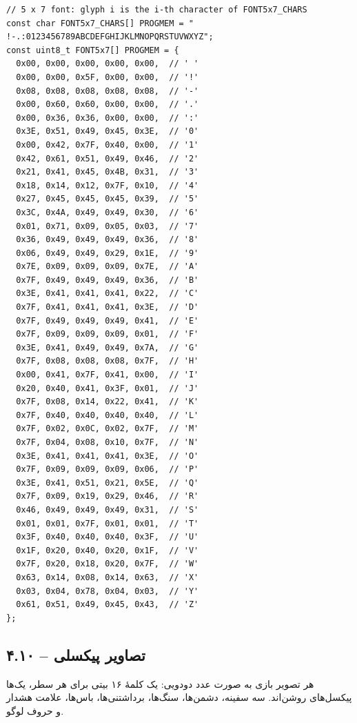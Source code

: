 \documentclass[11pt,a4paper]{article}
\begin{document}
\begin{latin}
\begin{lstlisting}[language=Arduino]
// 5 x 7 font: glyph i is the i-th character of FONT5x7_CHARS
const char FONT5x7_CHARS[] PROGMEM = " !-.:0123456789ABCDEFGHIJKLMNOPQRSTUVWXYZ";
const uint8_t FONT5x7[] PROGMEM = {
  0x00, 0x00, 0x00, 0x00, 0x00,  // ' '
  0x00, 0x00, 0x5F, 0x00, 0x00,  // '!'
  0x08, 0x08, 0x08, 0x08, 0x08,  // '-'
  0x00, 0x60, 0x60, 0x00, 0x00,  // '.'
  0x00, 0x36, 0x36, 0x00, 0x00,  // ':'
  0x3E, 0x51, 0x49, 0x45, 0x3E,  // '0'
  0x00, 0x42, 0x7F, 0x40, 0x00,  // '1'
  0x42, 0x61, 0x51, 0x49, 0x46,  // '2'
  0x21, 0x41, 0x45, 0x4B, 0x31,  // '3'
  0x18, 0x14, 0x12, 0x7F, 0x10,  // '4'
  0x27, 0x45, 0x45, 0x45, 0x39,  // '5'
  0x3C, 0x4A, 0x49, 0x49, 0x30,  // '6'
  0x01, 0x71, 0x09, 0x05, 0x03,  // '7'
  0x36, 0x49, 0x49, 0x49, 0x36,  // '8'
  0x06, 0x49, 0x49, 0x29, 0x1E,  // '9'
  0x7E, 0x09, 0x09, 0x09, 0x7E,  // 'A'
  0x7F, 0x49, 0x49, 0x49, 0x36,  // 'B'
  0x3E, 0x41, 0x41, 0x41, 0x22,  // 'C'
  0x7F, 0x41, 0x41, 0x41, 0x3E,  // 'D'
  0x7F, 0x49, 0x49, 0x49, 0x41,  // 'E'
  0x7F, 0x09, 0x09, 0x09, 0x01,  // 'F'
  0x3E, 0x41, 0x49, 0x49, 0x7A,  // 'G'
  0x7F, 0x08, 0x08, 0x08, 0x7F,  // 'H'
  0x00, 0x41, 0x7F, 0x41, 0x00,  // 'I'
  0x20, 0x40, 0x41, 0x3F, 0x01,  // 'J'
  0x7F, 0x08, 0x14, 0x22, 0x41,  // 'K'
  0x7F, 0x40, 0x40, 0x40, 0x40,  // 'L'
  0x7F, 0x02, 0x0C, 0x02, 0x7F,  // 'M'
  0x7F, 0x04, 0x08, 0x10, 0x7F,  // 'N'
  0x3E, 0x41, 0x41, 0x41, 0x3E,  // 'O'
  0x7F, 0x09, 0x09, 0x09, 0x06,  // 'P'
  0x3E, 0x41, 0x51, 0x21, 0x5E,  // 'Q'
  0x7F, 0x09, 0x19, 0x29, 0x46,  // 'R'
  0x46, 0x49, 0x49, 0x49, 0x31,  // 'S'
  0x01, 0x01, 0x7F, 0x01, 0x01,  // 'T'
  0x3F, 0x40, 0x40, 0x40, 0x3F,  // 'U'
  0x1F, 0x20, 0x40, 0x20, 0x1F,  // 'V'
  0x7F, 0x20, 0x18, 0x20, 0x7F,  // 'W'
  0x63, 0x14, 0x08, 0x14, 0x63,  // 'X'
  0x03, 0x04, 0x78, 0x04, 0x03,  // 'Y'
  0x61, 0x51, 0x49, 0x45, 0x43,  // 'Z'
};
\end{lstlisting}

\end{latin}

\clearpage
\subsection*{۴.۱۰  – تصاویر پیکسلی}
هر تصویر بازی به صورت عدد دودویی: یک کلمهٔ ۱۶ بیتی برای هر سطر، یک‌ها پیکسل‌های روشن‌اند. سه سفینه، دشمن‌ها، سنگ‌ها، برداشتنی‌ها، باس‌ها، علامت هشدار و حروف لوگو.
\end{document}
